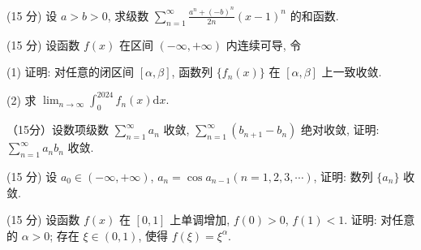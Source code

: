 \par{}
(15 分) 设 $a > b > 0$, 求级数 $\sum_{n=1}^{\infty} \frac{a^n + (-b)^n}{2n} (x - 1)^n$ 的和函数.\par
\par{}
\par{}
(15 分) 设函数 $f(x)$ 在区间 $(- \infty, +\infty)$ 内连续可导, 令\par
\nopagebreak[4]
(1) 证明: 对任意的闭区间 $[\alpha, \beta]$, 函数列 $\{f_n(x)\}$ 在 $[\alpha, \beta]$ 上一致收敛.\par
(2) 求 $\lim_{n\to \infty}\int_0^{2024}f_n(x)\mathrm{d}x.$\par
\par{}
（15分）设数项级数 $\sum_{n=1}^{\infty} a_n$ 收敛, $\sum_{n=1}^{\infty} (b_{n+1} - b_n)$ 绝对收敛, 证明: $\sum_{n=1}^{\infty} a_n b_n$ 收敛.\par
\par{}
(15 分) 设 $a_0 \in (-\infty, +\infty)$, $a_n = \cos a_{n-1} (n = 1, 2, 3, \cdots)$, 证明: 数列 $\{a_n\}$ 收敛.\par
\par{}
(15 分) 设函数 $f(x)$ 在 $[0,1]$ 上单调增加, $f(0) > 0$, $f(1) < 1$. 证明: 对任意的 $\alpha > 0$; 存在 $\xi \in (0,1)$, 使得 $f(\xi) = \xi^{\alpha}$.\par
